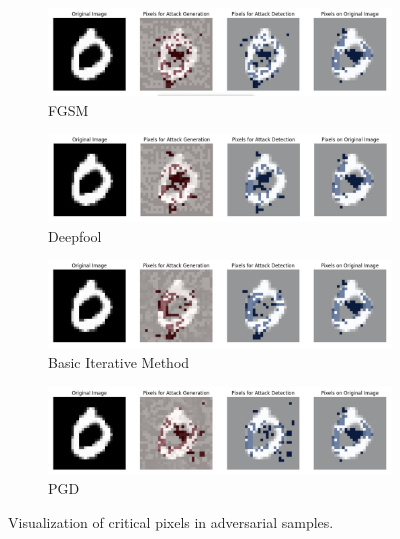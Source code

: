 \documentclass[10pt, conference, a4paper, final]{IEEEtran}
\begin{document}
    
    \begin{figure}[h]
        \centering
        \begin{subfigure}{\columnwidth}
            \centering
            \includegraphics[width=\linewidth]{paper_images/fgsm_c.png}
            \caption{FGSM}
            \label{fig:fgsm_c}
        \end{subfigure}
        \par\medskip %
        \begin{subfigure}{\columnwidth}
            \centering
            \includegraphics[width=\linewidth]{paper_images/deep_c.png}
            \caption{Deepfool}
            \label{fig:deep_c}
        \end{subfigure}
        \begin{subfigure}{\columnwidth}
            \centering
            \includegraphics[width=\linewidth]{paper_images/basic_c.png}
            \caption{Basic Iterative Method}
            \label{fig:fgsm}
        \end{subfigure}
        \begin{subfigure}{\columnwidth}
            \centering
            \includegraphics[width=\linewidth]{paper_images/pgd_c.png}
            \caption{PGD}
            \label{fig:deep}
        \end{subfigure}
     
        \caption{Visualization of critical pixels in adversarial samples.}
        \label{fig:both_shap_figures}
    \end{figure}
    
\end{document}
